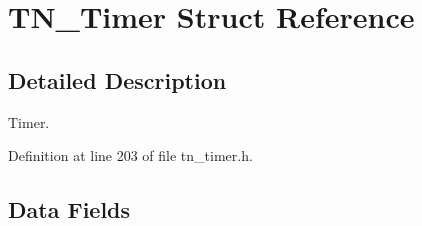 \hypertarget{structTN__Timer}{}\section{T\+N\+\_\+\+Timer Struct Reference}
\label{structTN__Timer}


\subsection{Detailed Description}
Timer. 

Definition at line 203 of file tn\+\_\+timer.\+h.

\subsection*{Data Fields}
